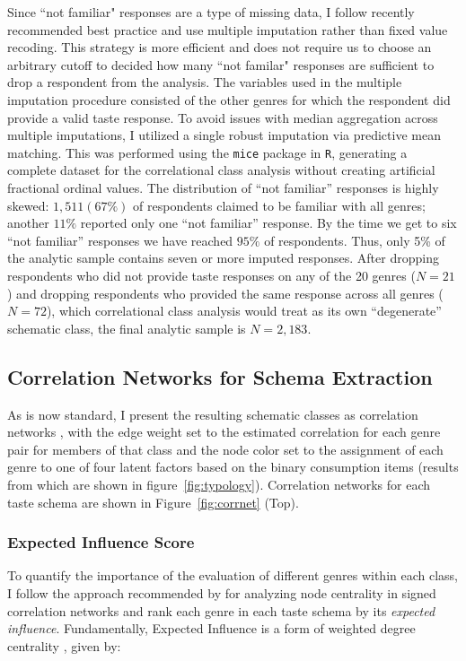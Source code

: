 \documentclass[preprint, authoryear,11pt, 3p]{elsarticle}
\begin{document}
Since ``not familiar" responses are a type of missing data, I follow recently recommended best practice and use multiple imputation rather than fixed value recoding. This strategy is more efficient and does not require us to choose an arbitrary cutoff to decided how many ``not familar" responses are sufficient to drop a respondent from the analysis. The variables used in the multiple imputation procedure consisted of the other genres for which the respondent did provide a valid taste response. To avoid issues with median aggregation across multiple imputations, I utilized a single robust imputation via predictive mean matching. This was performed using the \texttt{mice} package in \texttt{R}, generating a complete dataset for the correlational class analysis without creating artificial fractional ordinal values. The distribution of ``not familiar'' responses is highly skewed: $1,511 (67\%)$ of respondents claimed to be familiar with all genres; another $11\%$ reported only one ``not familiar'' response. By the time we get to six ``not familiar'' responses we have reached $95\%$ of respondents. Thus, only 5\% of the analytic sample contains seven or more imputed responses. After dropping respondents who did not provide taste responses on any of the 20 genres ($N = 21$) and dropping respondents who provided the same response across all genres ($N = 72$), which correlational class analysis would treat as its own ``degenerate'' schematic class, the final analytic sample is $N= 2,183$.

\subsection{Correlation Networks for Schema Extraction} 
As is now standard, I present the resulting schematic classes as correlation networks \citep{ boutyline2017improving, goldberg2011mapping, epskamp2012qgraph}, with the edge weight set to the estimated correlation for each genre pair for members of that class and the node color set to the assignment of each genre to one of four latent factors based on the binary consumption items (results from which are shown in figure~\ref{fig:typology}). Correlation networks for each taste schema are shown in Figure~\ref{fig:corrnet} (Top). 

\subsubsection{Expected Influence Score}
To quantify the importance of the evaluation of different genres within each class, I follow the approach recommended by \citet{robinaugh2016identifying} for analyzing node centrality in signed correlation networks and rank each genre in each taste schema by its \emph{expected influence}. Fundamentally, Expected Influence is a form of weighted degree centrality \citep{barrat2004architecture}, given by:
\end{document}

